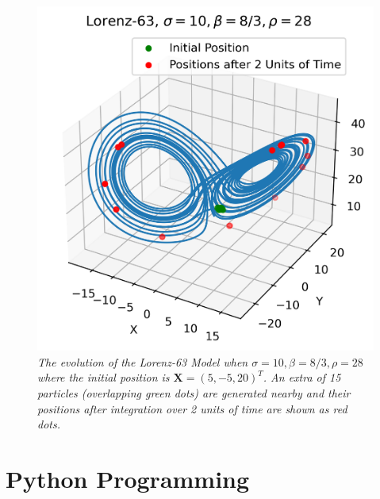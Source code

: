 \begin{figure}
    \centering
    \includegraphics[scale=0.8]{graphics/Lorenz63_28.png}
    \caption{\textit{The evolution of the Lorenz-63 Model when $\sigma=10, \beta=8/3, \rho=28$ where the initial position is $\textbf{X} = (5,-5,20)^T$. An extra of 15 particles (overlapping green dots) are generated nearby and their positions after integration over 2 units of time are shown as red dots.}}
    \label{fig:lor63r28}
\end{figure}

\section{Python Programming}

